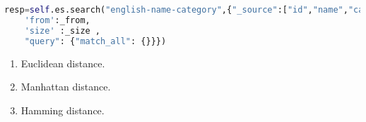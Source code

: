 \begin{lstlisting}[language=Python]
    resp=self.es.search("english-name-category",{"_source":["id","name","category"],
    'from':_from,
    'size' :_size ,
    "query": {"match_all": {}}})
\end{lstlisting}


\begin{enumerate}
    \item Euclidean distance.
    \item Manhattan distance.
    \item Hamming distance.
\end{enumerate}

